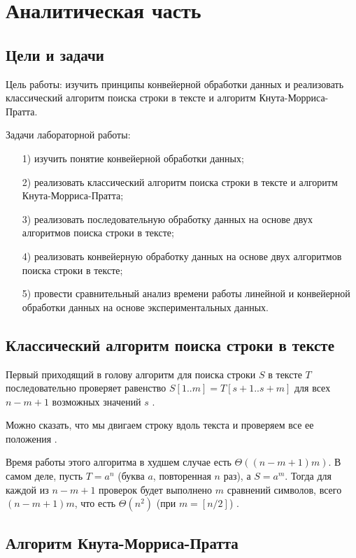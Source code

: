 \chapter{Аналитическая часть}

\section{Цели и задачи}

Цель работы: изучить принципы конвейерной обработки данных и реализовать классический алгоритм поиска строки в тексте и алгоритм Кнута-Морриса-Пратта.

Задачи лабораторной работы:

\begin{enumerate}
\item[1)] изучить понятие конвейерной обработки данных;
\item[2)] реализовать классический алгоритм поиска строки в тексте и алгоритм Кнута-Морриса-Пратта;
\item[3)] реализовать последовательную обработку данных на основе двух алгоритмов поиска строки в тексте;
\item[4)] реализовать конвейерную обработку данных на основе двух алгоритмов поиска строки в тексте;
\item[5)] провести сравнительный анализ времени работы линейной и конвейерной обработки данных на основе экспериментальных данных.
\end{enumerate}

\section{Классический алгоритм поиска строки в тексте}

Первый приходящий в голову алгоритм для поиска строки $S$ в тексте $T$ последовательно проверяет равенство $S[1..m] = T[s + 1..s + m]$ для всех $n - m + 1$ возможных значений $s$ \cite{Cormen2013}.

Можно сказать, что мы двигаем строку вдоль текста и проверяем все ее положения \cite{Cormen2013}.

Время работы этого алгоритма в худшем случае есть $\Theta ((n - m + 1)m)$. 
В самом деле, пусть $T = a^n$ (буква $a$, повторенная $n$ раз), а $S = a^m$. 
Тогда для каждой из $n - m + 1$ проверок будет выполнено $m$ сравнений символов, всего $(n - m + 1)m$, что есть $\Theta (n^2)$ (при $m = [n / 2]$) \cite{Cormen2013}.

\section{Алгоритм Кнута-Морриса-Пратта}

